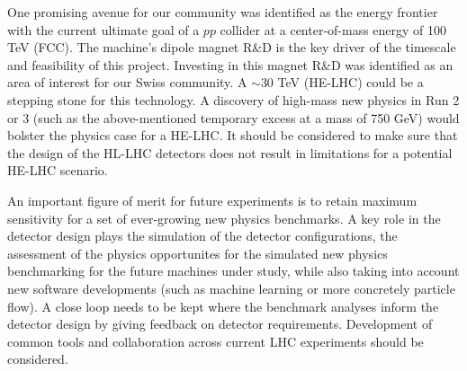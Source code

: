 One promising avenue for our community was identified as the energy frontier with the current ultimate 
goal of a $pp$ collider at a center-of-mass energy of 100 TeV (FCC).  The machine's dipole magnet R\&D 
is the key driver of the timescale and feasibility of this project.  Investing in this magnet R\&D was 
identified as an area of interest for our Swiss community.  A $\sim30$ TeV (HE-LHC) could be a 
stepping stone for this technology.  A discovery of high-mass new physics in Run 2 or 3 (such as the 
above-mentioned temporary excess at a mass of 750 GeV) would bolster the physics case for a HE-LHC. It 
should be considered to make sure that the design of the HL-LHC detectors does not result in 
limitations for a potential HE-LHC scenario.

An important figure of merit for future experiments is to retain maximum sensitivity for a set of 
ever-growing new physics benchmarks.  A key role in the detector design plays the simulation of the 
detector configurations, the assessment of the physics opportunites for the simulated new physics 
benchmarking for the future machines under study, while also taking into account new software 
developments (such as machine learning or more concretely particle flow).  A close loop needs to be 
kept where the benchmark analyses inform the detector design by giving feedback on detector 
requirements.  Development of common tools and collaboration across current LHC experiments should be 
considered.



